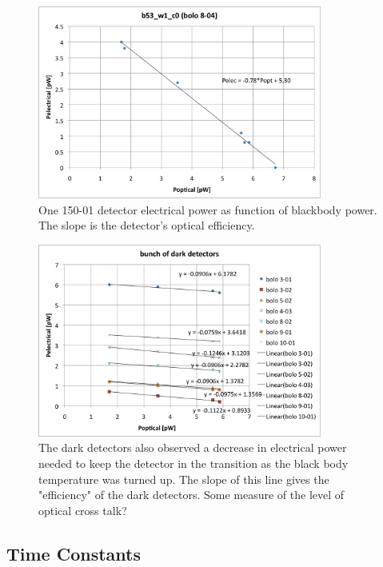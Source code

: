 \begin{figure}[ht!]
\begin{center}
\includegraphics[height=2.5in]{figures/Nb01_PelecvsPopt_b53_w1_c0}
\caption{One 150-01 detector electrical power as function of blackbody power. The slope is the detector's optical efficiency. 
\label{fig:pelec_vs_popt} }
\end{center}
\end{figure}


\begin{figure}[ht!]
\begin{center}
\includegraphics[height=2.5in]{figures/darkdetectoreffs}
\caption{The dark detectors also observed a decrease in electrical power needed to keep the detector in the transition as the black body temperature was turned up. The slope of this line gives the "efficiency" of the dark detectors. Some measure of the level of optical cross talk?
\label{fig:dark_optical_efficiencies} }
\end{center}
\end{figure}



\subsection{Time Constants}
\label{sec:time_constants}

